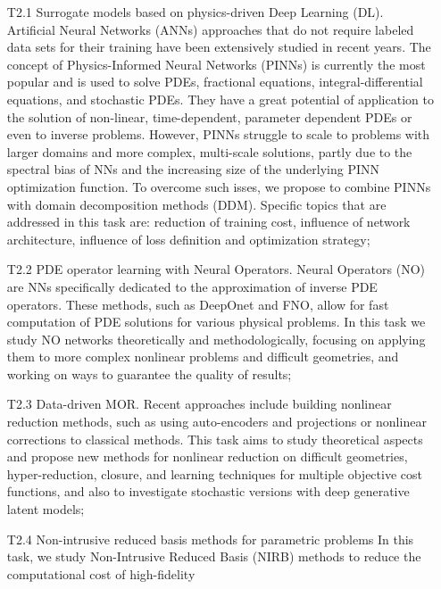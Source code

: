 \begin{itemize}
\item[T2.1]  Surrogate models  based on  physics-driven Deep  Learning
  (DL).   Artificial Neural  Networks  (ANNs) approaches  that do  not
  require labeled data  sets for their training  have been extensively
  studied  in recent  years.  The  concept of  Physics-Informed Neural
  Networks (PINNs) is currently the most  popular and is used to solve
  PDEs,  fractional  equations, integral-differential  equations,  and
  stochastic PDEs. They  have a great potential of  application to the
  solution of non-linear, time-dependent,  parameter dependent PDEs or
  even  to inverse  problems.   However, PINNs  struggle  to scale  to
  problems  with   larger  domains   and  more   complex,  multi-scale
  solutions, partly due to the spectral bias of NNs and the increasing
  size of the underlying PINN  optimization function. To overcome such
  isses, we propose to combine PINNs with domain decomposition methods
  (DDM).   Specific  topics  that  are addressed  in  this  task  are:
  reduction  of  training  cost, influence  of  network  architecture,
  influence of loss definition and optimization strategy; 
\item[T2.2]  PDE  operator  learning with  Neural  Operators.   Neural
  Operators (NO)  are NNs specifically dedicated  to the approximation
  of inverse PDE operators.  These  methods, such as DeepOnet and FNO,
  allow for  fast computation  of PDE  solutions for  various physical
  problems.  In  this task  we  study  NO networks  theoretically  and
  methodologically,  focusing   on  applying  them  to   more  complex
  nonlinear problems and difficult geometries,  and working on ways to
  guarantee the quality of results;
\item  [T2.3]  Data-driven  MOR. Recent  approaches  include  building
  nonlinear  reduction  methods,  such   as  using  auto-encoders  and
  projections or nonlinear corrections to classical methods. This task
  aims  to  study theoretical  aspects  and  propose new  methods  for
  nonlinear  reduction   on  difficult   geometries,  hyper-reduction,
  closure,  and  learning  techniques   for  multiple  objective  cost
  functions,  and also  to investigate  stochastic versions  with deep
  generative latent models;  
\item[T2.4]  Non-intrusive   reduced  basis  methods   for  parametric
  problems In this  task, we study Non-Intrusive  Reduced Basis (NIRB)
  methods   to  reduce   the  computational   cost  of   high-fidelity

\end{itemize}
